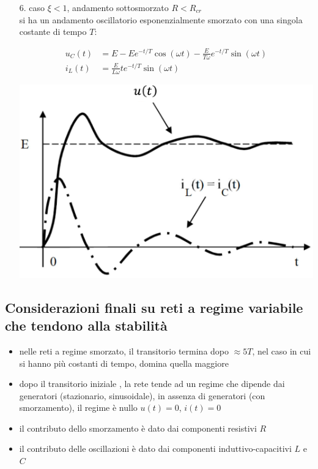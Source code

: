 \documentclass[a4paper]{article}
\begin{document}
\begin{itemize}[itemsep=0pt]
	\item[6.] caso \(\xi < 1\), andamento sottosmorzato \(R < R_{cr}\) \\
	si ha un andamento oscillatorio esponenzialmente smorzato con una singola costante di tempo \(T\):
	
	\begin{minipage}{0.5\textwidth}
		\begin{align*}
			u_C(t) &= E - E e^{-t/T} \cos (\omega t) - \frac{E}{T\omega} e^{-t/T}\sin (\omega t) \\
			i_L(t) &= \frac{E}{L\omega}t e^{-t/T} \sin (\omega t)
		\end{align*}
	\end{minipage}
	\begin{minipage}{0.4\textwidth}
		\centering
		\includegraphics[width=0.6\linewidth]{immagini/rlc sottosmorzato.png}
	\end{minipage}
\end{itemize}

\subsection{Considerazioni finali su reti a regime variabile che tendono alla stabilità}
\begin{itemize}
	\item nelle reti a regime smorzato, il transitorio termina dopo \(\approx 5T\), nel caso in cui si hanno più
	costanti di tempo, domina quella maggiore
	\item dopo il transitorio iniziale , la rete tende ad un regime che dipende dai generatori (stazionario, sinusoidale), in
	assenza di generatori (con smorzamento), il regime è nullo \(u(t) = 0\), \(i(t) = 0\) 
	\item il contributo dello smorzamento è dato dai componenti resistivi \(R\)
	\item il contributo delle oscillazioni è dato dai componenti induttivo-capacitivi \(L\) e \(C\)
\end{itemize}
\end{document}
